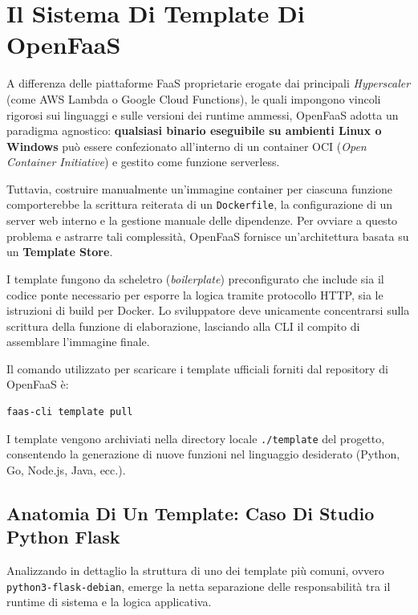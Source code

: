 \documentclass[11pt, a4paper]{article}
\begin{document}
\section{Il Sistema Di Template Di OpenFaaS}

A differenza delle piattaforme FaaS proprietarie erogate dai principali \emph{Hyperscaler} (come AWS Lambda o Google Cloud Functions), le quali impongono vincoli rigorosi sui linguaggi e sulle versioni dei runtime ammessi, OpenFaaS adotta un paradigma agnostico: \textbf{qualsiasi binario eseguibile su ambienti Linux o Windows} può essere confezionato all'interno di un container OCI (\emph{Open Container Initiative}) e gestito come funzione serverless.

Tuttavia, costruire manualmente un'immagine container per ciascuna funzione comporterebbe la scrittura reiterata di un \texttt{Dockerfile}, la configurazione di un server web interno e la gestione manuale delle dipendenze. Per ovviare a questo problema e astrarre tali complessità, OpenFaaS fornisce un'architettura basata su un \textbf{Template Store}.

I template fungono da scheletro (\emph{boilerplate}) preconfigurato che include sia il codice ponte necessario per esporre la logica tramite protocollo HTTP, sia le istruzioni di build per Docker. Lo sviluppatore deve unicamente concentrarsi sulla scrittura della funzione di elaborazione, lasciando alla CLI il compito di assemblare l'immagine finale.

Il comando utilizzato per scaricare i template ufficiali forniti dal repository di OpenFaaS è:
\begin{lstlisting}[language=bash]
faas-cli template pull
\end{lstlisting}

I template vengono archiviati nella directory locale \texttt{./template} del progetto, consentendo la generazione di nuove funzioni nel linguaggio desiderato (Python, Go, Node.js, Java, ecc.).


\subsection{Anatomia Di Un Template: Caso Di Studio Python Flask}

Analizzando in dettaglio la struttura di uno dei template più comuni, ovvero \texttt{python3-flask-debian}, emerge la netta separazione delle responsabilità tra il runtime di sistema e la logica applicativa.
\end{document}
